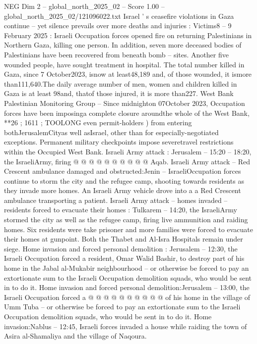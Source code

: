 \begin{textsample}{NEG Dim 2 – global\_north\_2025\_02 – Score 1.00 – global\_north\_2025\_02/121096022.txt}  \label{ex:f2_neg_011}
Israel ' s ceasefire violations in Gaza continue -- yet silence prevails over more deaths and injuries : Victims8 -- 9 February 2025 : Israeli Occupation forces opened fire on returning Palestinians in Northern Gaza, killing one person.
In addition, seven more deceased bodies of Palestinians have been recovered from beneath bomb -- sites.
Another five wounded people, have sought treatment in hospital.
The total number killed in Gaza, since 7 October2023, isnow at least48,189 and, of those wounded, it ismore than111,640.The daily average number of men, women and children killed in Gaza is at least 98and, thatof those injured, it is more than227.
West Bank Palestinian Monitoring Group -- Since midnighton 07October 2023, Occupation forces have been imposinga complete closure aroundthe whole of the West Bank, **26 ; 1611 ; TOOLONG even permit-holders ) from entering bothJerusalemCityas well asIsrael, other than for especially-negotiated exceptions.
Permanent military checkpoints impose severetravel restrictions within the Occupied West Bank.
Israeli Army attack : Jerusalem -- 15:20 -- 18:20, the IsraeliArmy, firing @ @ @ @ @ @ @ @ @ @ Aqab.
Israeli Army attack -- Red Crescent ambulance damaged and obstructed:Jenin -- IsraeliOccupation forces continue to storm the city and the refugee camp, shooting towards residents as they invade more homes.
An Israeli Army vehicle drove into a a Red Crescent ambulance transporting a patient.
Israeli Army attack -- homes invaded -- residents forced to evacuate their homes : Tulkarem -- 14:20, the IsraeliArmy stormed the city as well as the refugee camp, firing live ammunition and raiding homes.
Six residents were take prisoner and more families were forced to evacuate their homes at gunpoint.
Both the Thabet and Al-Isra Hospitals remain under siege.
Home invasion and forced personal demolition : Jerusalem -- 12:30, the Israeli Occupation forced a resident, Omar Walid Bashir, to destroy part of his home in the Jabal al-Mukabir neighbourhood -- or otherwise be forced to pay an extortionate sum to the Israeli Occupation demolition squads, who would be sent in to do it.
Home invasion and forced personal demolition:Jerusalem -- 13:00, the Israeli Occupation forced a @ @ @ @ @ @ @ @ @ @ of his home in the village of Umm Tuba -- or otherwise be forced to pay an extortionate sum to the Israeli Occupation demolition squads, who would be sent in to do it.
Home invasion:Nablus -- 12:45, Israeli forces invaded a house while raiding the town of Asira al-Shamaliya and the village of Naqoura.

\end{textsample}
